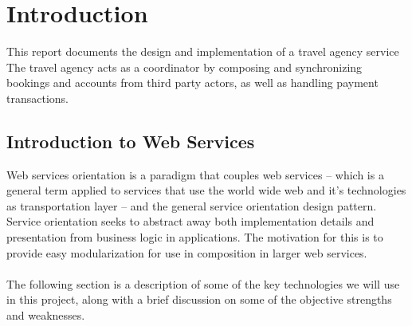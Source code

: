 \chapter{Introduction}

This report documents the design and implementation of a travel agency service The travel agency acts as a coordinator by composing and synchronizing bookings and accounts from third party actors, as well as handling payment transactions.

\section{Introduction to Web Services}


Web services orientation is a paradigm that couples web services -- which is a general term applied to services that use the world wide web and it's technologies as transportation layer -- and the general service orientation design pattern. Service orientation seeks to abstract away both implementation details and presentation from business logic in applications. The motivation for this is to provide easy modularization for use in composition in larger web services.\\\\
The following section is a description of some of the key technologies we will use in this project, along with a brief discussion on some of the objective strengths and weaknesses.

